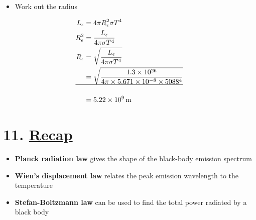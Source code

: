 \documentclass[
  letterpaper,
  DIV=11,
  numbers=noendperiod]{scrreprt}
\providecommand{\tightlist}{%
  \setlength{\itemsep}{0pt}\setlength{\parskip}{0pt}}\usepackage{longtable,booktabs,array}
\begin{document}
\begin{itemize}
\tightlist
\item
  Work out the radius
\end{itemize}

\begin{align}
L_\epsilon &= 4\pi R_\epsilon^2 \sigma T^4 \\
R_\epsilon^2 &= \frac{L_\epsilon}{4\pi \sigma T^4} \\
R_\epsilon &= \sqrt{\frac{L_\epsilon}{4\pi \sigma T^4}} \\
&= \sqrt{\frac{1.3\times 10^{26}}{4\pi \times 5.671\times10^{-8}\times 5088^4}}  \\
\hline \\
&= 5.22\times 10^{9}\,\mathrm{m}
\end{align}

\hypertarget{recap-1}{%
\chapter{\texorpdfstring{11.
\protect\hyperlink{toc0_}{Recap}}{11. Recap}}\label{recap-1}}

\begin{itemize}
\tightlist
\item
  \textbf{Planck radiation law} gives the shape of the black-body
  emission spectrum
\item
  \textbf{Wien's displacement law} relates the peak emission wavelength
  to the temperature
\item
  \textbf{Stefan-Boltzmann law} can be used to find the total power
  radiated by a black body
\end{itemize}
\end{document}
